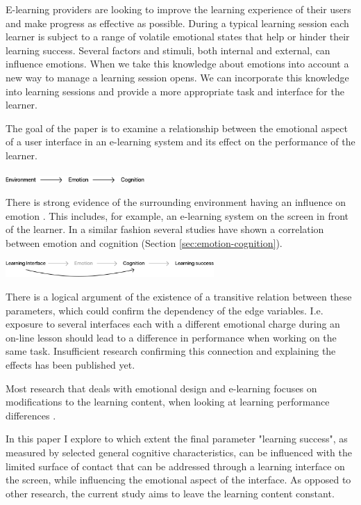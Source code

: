 E-learning providers are looking to improve the learning experience of their users and make progress as effective as possible. 
During a typical learning session each learner is subject to a range of volatile emotional states that help or hinder their learning success. 
Several factors and stimuli, both internal and external, can influence emotions. 
When we take this knowledge about emotions into account a new way to manage a learning session opens. We can incorporate this knowledge into learning sessions and provide a more appropriate task and interface for the learner.

The goal of the paper is to examine a relationship between the emotional aspect of a user interface in an e-learning system and its effect on the performance of the learner.


\begin{center}
	\includegraphics[width=200px]{graphics/relation1.png}
\end{center}
 
There is strong evidence of the surrounding environment having an influence on emotion \cite{Johnson2000, Arockiam2013, Bertamini2013}. This includes, for example, an e-learning system on the screen in front of the learner. In a similar fashion several studies have shown a correlation between emotion and cognition (Section \ref{sec:emotion-cognition}).

\begin{center}
\includegraphics[width=300px]{graphics/relation2.png}
\end{center}

There is a logical argument of the existence of a transitive relation between these parameters, which could confirm the dependency of the edge variables. 
I.e. exposure to several interfaces each with a different emotional charge during an on-line lesson should lead to a difference in performance when working on the same task.
Insufficient research confirming this connection and explaining the effects has been published yet. 

Most research that deals with emotional design and e-learning focuses on modifications to the learning content, when looking at learning performance differences \cite{Plass2014, Plass2016}.

In this paper I explore to which extent the final parameter "learning success", as measured by selected general cognitive characteristics, can be influenced with the limited surface of contact that can be addressed through a learning interface on the screen, while influencing the emotional aspect of the interface. As opposed to other research, the current study aims to leave the learning content constant.